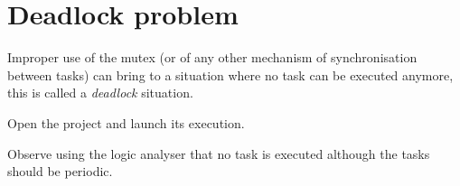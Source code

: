 \section{Deadlock problem}

Improper use of the mutex (or of any other mechanism of synchronisation between tasks) can bring
to a situation where no task can be executed anymore, this is called a \textit{deadlock} situation.

Open the  project and launch its execution.

{Observe using the logic analyser that no task is executed although the tasks should be periodic.}{}



